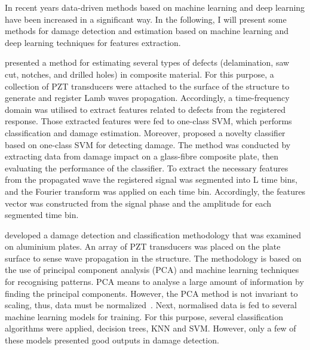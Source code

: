 In recent years data-driven methods based on machine learning and deep learning have been increased in a significant way. 
In the following, I will present some methods for damage detection and estimation based on machine learning and deep learning techniques for features extraction.

\textcite{Das2010} presented a method for estimating several types of defects (delamination, saw cut, notches, and drilled holes) in composite material. 
For this purpose, a collection of PZT transducers were attached to the surface of the structure to generate and register Lamb waves propagation. 
Accordingly, a time-frequency domain was utilised to extract features related to defects from the registered response. 
Those extracted features were fed to one-class SVM, which performs classification and damage estimation. 
Moreover, \textcite{Dib2018} proposed a novelty classifier based on one-class SVM for detecting damage. 
The method was conducted by extracting data from damage impact on a glass-fibre composite plate, then evaluating the performance of the classifier. 
To extract the necessary features from the propagated wave the registered signal was segmented into L time bins, and the Fourier transform was applied on each time bin.
Accordingly, the features vector was constructed from the signal phase and the amplitude for each segmented time bin.

\textcite{Vitola2016} developed a damage detection and classification methodology that was examined on aluminium plates.
An array of PZT transducers was placed on the plate surface to sense wave propagation in the structure.
The methodology is based on the use of principal component analysis (PCA) and machine learning techniques for recognising patterns. 
PCA means to analyse a large amount of information by finding the principal components.
However, the PCA method is not invariant to scaling, thus, data must be normalized~\cite{Tibaduiza2016}. 
Next, normalised data is fed to several machine learning models for training. 
For this purpose, several classification algorithms were applied, decision trees, KNN and SVM. 
However, only a few of these models presented good outputs in damage detection. 

